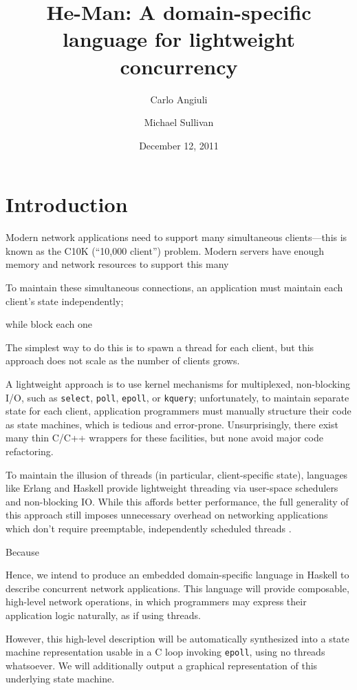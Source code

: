 \documentclass{article}
\title{He-Man: A domain-specific language for lightweight concurrency}
\author{Carlo Angiuli \and Michael Sullivan}
\date{December 12, 2011}
\renewcommand{\t}{\texttt}
\begin{document}
\maketitle

\section{Introduction}

Modern network applications need to support many simultaneous clients---this is
known as the C10K (``10,000 client'') problem\cite{Kegel}. Modern servers have
enough memory and network resources to support this many 

To maintain these simultaneous connections, an application must maintain each
client's state independently;

while 
block each one

The simplest way to do this is to spawn a thread for each client, but this
approach does not scale as the number of clients grows. 

A lightweight approach is to use kernel mechanisms for multiplexed, non-blocking
I/O, such as \t{select}, \t{poll}, \t{epoll}, or \t{kquery}; unfortunately, to
maintain separate state for each client, application programmers must manually
structure their code as state machines, which is tedious and error-prone.
Unsurprisingly, there exist many thin C/C++ wrappers for these facilities, but
none avoid major code refactoring.

To maintain the illusion of threads (in particular, client-specific state),
languages like Erlang and Haskell provide lightweight threading via user-space
schedulers and non-blocking IO. While this affords better performance, the full
generality of this approach still imposes unnecessary overhead on networking
applications which don't require preemptable, independently scheduled threads
\cite{Vinoski}.

Because 

Hence, we intend to produce an embedded domain-specific language in Haskell to
describe concurrent network applications. This language will provide composable,
high-level network operations, in which programmers may express their
application logic naturally, as if using threads. 

However, this high-level description will be automatically synthesized into a
state machine representation usable in a C loop invoking \t{epoll}, using no
threads whatsoever. We will additionally output a graphical representation of
this underlying state machine.
\end{document}
